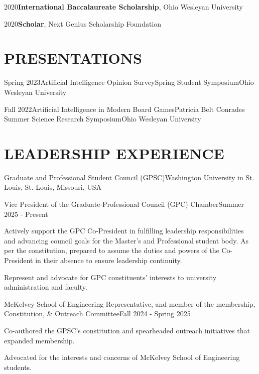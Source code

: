 \begin{honorentry}{2020}{\textbf{International Baccalaureate Scholarship}, Ohio Wesleyan University}
\end{honorentry}

\begin{honorentry}{2020}{\textbf{Scholar}, Next Genius Scholarship Foundation}
\end{honorentry}

\vspace{\headerSpacing}
\section{PRESENTATIONS}

\begin{presentationentry}{Spring 2023}{Artificial Intelligence Opinion Survey}{Spring Student Symposium}{Ohio Wesleyan University}
\end{presentationentry}

\begin{presentationentry}{Fall 2022}{Artificial Intelligence in Modern Board Games}{Patricia Belt Conrades Summer Science Research Symposium}{Ohio Wesleyan University}
\end{presentationentry}

\vspace{\headerSpacing}
\section{LEADERSHIP EXPERIENCE}

\begin{leadershipentry}{Graduate and Professional Student Council (GPSC)}{Washington University in St. Louis, St. Louis, Missouri, USA}
    \begin{positionentry}{Vice President of the Graduate-Professional Council (GPC) Chamber}{Summer 2025 - Present}
        \item Actively support the GPC Co-President in fulfilling leadership responsibilities and advancing council goals for the Master's and Professional student body. As per the constitution, prepared to assume the duties and powers of the Co-President in their absence to ensure leadership continuity.
        \item Represent and advocate for GPC constituents' interests to university administration and faculty.
    \end{positionentry}
    \begin{positionentry}{McKelvey School of Engineering Representative, and member of the membership, Constitution, \& Outreach Committee}{Fall 2024 - Spring 2025}
        \item Co-authored the GPSC's constitution and spearheaded outreach initiatives that expanded membership.
        \item Advocated for the interests and concerns of McKelvey School of Engineering students.
    \end{positionentry}
\end{leadershipentry}

